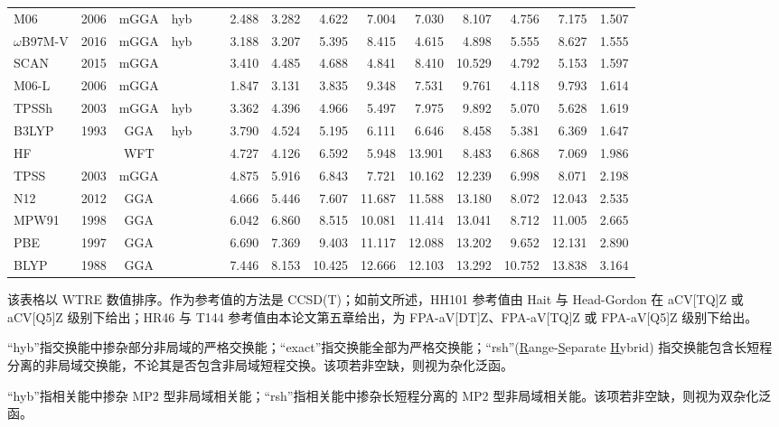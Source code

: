 \begin{landscape}
\begin{longtable}[c]{lc:cccc:rrrr:rr:rr:c}
M06              & 2006 & mGGA & hyb &     &     & 2.488 & 3.282 & 4.622  & 7.004  & 7.030  & 8.107  & 4.756  & 7.175  & 1.507 \\
$\omega$B97M-V          & 2016 & mGGA & hyb &     &     & 3.188 & 3.207 & 5.395  & 8.415  & 4.615  & 4.898  & 5.555  & 8.627  & 1.555 \\
SCAN             & 2015 & mGGA &     &     &     & 3.410 & 4.485 & 4.688  & 4.841  & 8.410  & 10.529 & 4.792  & 5.153  & 1.597 \\
M06-L            & 2006 & mGGA &     &     &     & 1.847 & 3.131 & 3.835  & 9.348  & 7.531  & 9.761  & 4.118  & 9.793  & 1.614 \\
TPSSh            & 2003 & mGGA & hyb &     &     & 3.362 & 4.396 & 4.966  & 5.497  & 7.975  & 9.892  & 5.070  & 5.628  & 1.619 \\
B3LYP            & 1993 & GGA  & hyb &     &     & 3.790 & 4.524 & 5.195  & 6.111  & 6.646  & 8.458  & 5.381  & 6.369  & 1.647 \\
HF               &      & WFT  &     &     &     & 4.727 & 4.126 & 6.592  & 5.948  & 13.901 & 8.483  & 6.868  & 7.069  & 1.986 \\
TPSS             & 2003 & mGGA &     &     &     & 4.875 & 5.916 & 6.843  & 7.721  & 10.162 & 12.239 & 6.998  & 8.071  & 2.198 \\
N12              & 2012 & GGA  &     &     &     & 4.666 & 5.446 & 7.607  & 11.687 & 11.588 & 13.180 & 8.072  & 12.043 & 2.535 \\
MPW91            & 1998 & GGA  &     &     &     & 6.042 & 6.860 & 8.515  & 10.081 & 11.414 & 13.041 & 8.712  & 11.005 & 2.665 \\
PBE              & 1997 & GGA  &     &     &     & 6.690 & 7.369 & 9.403  & 11.117 & 12.088 & 13.202 & 9.652  & 12.131 & 2.890 \\
BLYP             & 1988 & GGA  &     &     &     & 7.446 & 8.153 & 10.425 & 12.666 & 12.103 & 13.292 & 10.752 & 13.838 & 3.164
\end{longtable}
\small
\vspace{-1em}
\par\noindent{} 该表格以 WTRE 数值排序。作为参考值的方法是 CCSD(T)；如前文所述，HH101 参考值由 Hait 与 Head-Gordon 在 aCV[TQ]Z 或 aCV[Q5]Z 级别下给出\cite{Hait-Head-Gordon.PCCP.2018}；HR46 与 T144 参考值由本论文第五章给出，为 FPA-aV[DT]Z、FPA-aV[TQ]Z 或 FPA-aV[Q5]Z 级别下给出。
\par\noindent{} “hyb”指交换能中掺杂部分非局域的严格交换能；“exact”指交换能全部为严格交换能；“rsh”(\underline{R}ange-\underline{S}eparate \underline{H}ybrid) 指交换能包含长短程分离的非局域交换能，不论其是否包含非局域短程交换。该项若非空缺，则视为杂化泛函。
\par\noindent{} “hyb”指相关能中掺杂 MP2 型非局域相关能；“rsh”指相关能中掺杂长短程分离的 MP2 型非局域相关能。该项若非空缺，则视为双杂化泛函。
\end{landscape}

\newpage




